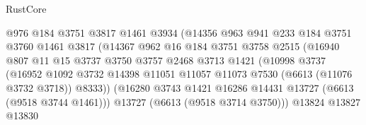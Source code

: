 \begin{lexlean}{RustCore}
\begin{coremodule}
                                  @976
                                  @184
                                  @3751
                                  @3817
                                  @1461
                                  @3934
                                  (@14356
                                    @963
                                    @941
                                    @233
                                    @184
                                    @3751
                                    @3760
                                    @1461
                                    @3817
                                    (@14367
                                      @962
                                      @16
                                      @184
                                      @3751
                                      @3758
                                      @2515
                                      (@16940
                                        @807
                                        @11
                                        @15
                                        @3737
                                        @3750
                                        @3757
                                        @2468
                                        @3713
                                        @1421
                                        (@10998
                                          @3737
                                          (@16952
                                            @1092
                                            @3732
                                            @14398
                                            @11051
                                            @11057
                                            @11073
                                            @7530
                                            (@6613 (@11076 @3732 @3718))
                                            @8333))
                                        (@16280
                                          @3743
                                          @1421
                                          @16286
                                          @14431
                                          @13727
                                          (@6613 (@9518 @3744 @1461)))
                                        @13727
                                        (@6613 (@9518 @3714 @3750)))
                                      @13824
                                      @13827
                                      @13830

\end{coremodule}
\end{lexlean}
